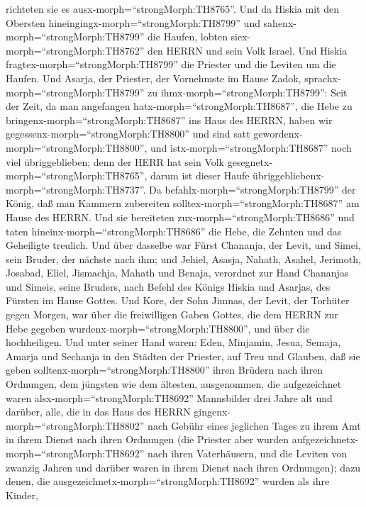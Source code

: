 richteten sie es ausx-morph=``strongMorph:TH8765''.  Und da
Hiskia mit den Obersten hineingingx-morph=``strongMorph:TH8799'' und
sahenx-morph=``strongMorph:TH8799'' die Haufen, lobten
siex-morph=``strongMorph:TH8762'' den HERRN und sein Volk Israel.
 Und Hiskia fragtex-morph=``strongMorph:TH8799'' die
Priester und die Leviten um die Haufen.  Und Asarja, der
Priester, der Vornehmste im Hause Zadok,
sprachx-morph=``strongMorph:TH8799'' zu
ihmx-morph=``strongMorph:TH8799'': Seit der Zeit, da man angefangen
hatx-morph=``strongMorph:TH8687'', die Hebe zu
bringenx-morph=``strongMorph:TH8687'' ins Haus des HERRN, haben wir
gegessenx-morph=``strongMorph:TH8800'' und sind satt
gewordenx-morph=``strongMorph:TH8800'', und
istx-morph=``strongMorph:TH8687'' noch viel übriggeblieben; denn der
HERR hat sein Volk gesegnetx-morph=``strongMorph:TH8765'', darum ist
dieser Haufe übriggebliebenx-morph=``strongMorph:TH8737''. 
Da befahlx-morph=``strongMorph:TH8799'' der König, daß man Kammern
zubereiten solltex-morph=``strongMorph:TH8687'' am Hause des HERRN. Und
sie bereiteten zux-morph=``strongMorph:TH8686''  und taten
hineinx-morph=``strongMorph:TH8686'' die Hebe, die Zehnten und das
Geheiligte treulich. Und über dasselbe war Fürst Chananja, der Levit,
und Simei, sein Bruder, der nächste nach ihm;  und Jehiel,
Asasja, Nahath, Asahel, Jerimoth, Josabad, Eliel, Jismachja, Mahath und
Benaja, verordnet zur Hand Chananjas und Simeis, seine Bruders, nach
Befehl des Königs Hiskia und Asarjas, des Fürsten im Hause Gottes.
 Und Kore, der Sohn Jimnas, der Levit, der Torhüter gegen
Morgen, war über die freiwilligen Gaben Gottes, die dem HERRN zur Hebe
gegeben wurdenx-morph=``strongMorph:TH8800'', und über die hochheiligen.
 Und unter seiner Hand waren: Eden, Minjamin, Jesua,
Semaja, Amarja und Sechanja in den Städten der Priester, auf Treu und
Glauben, daß sie geben solltenx-morph=``strongMorph:TH8800'' ihren
Brüdern nach ihren Ordnungen, dem jüngsten wie dem ältesten,
 ausgenommen, die aufgezeichnet waren
alsx-morph=``strongMorph:TH8692'' Mannsbilder drei Jahre alt und
darüber, alle, die in das Haus des HERRN
gingenx-morph=``strongMorph:TH8802'' nach Gebühr eines jeglichen Tages
zu ihrem Amt in ihrem Dienst nach ihren Ordnungen  (die
Priester aber wurden aufgezeichnetx-morph=``strongMorph:TH8692'' nach
ihren Vaterhäusern, und die Leviten von zwanzig Jahren und darüber waren
in ihrem Dienst nach ihren Ordnungen);  dazu denen, die
ausgezeichnetx-morph=``strongMorph:TH8692'' wurden als ihre Kinder,
